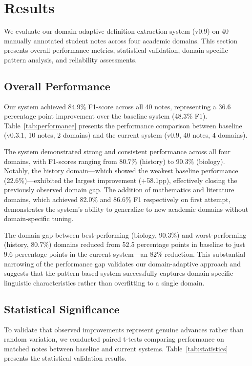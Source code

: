 \section{Results}

We evaluate our domain-adaptive definition extraction system (v0.9) on 40 manually annotated student notes across four academic domains. This section presents overall performance metrics, statistical validation, domain-specific pattern analysis, and reliability assessments.

\subsection{Overall Performance}

Our system achieved 84.9\% F1-score across all 40 notes, representing a 36.6 percentage point improvement over the baseline system (48.3\% F1). Table~\ref{tab:performance} presents the performance comparison between baseline (v0.3.1, 10 notes, 2 domains) and the current system (v0.9, 40 notes, 4 domains).



The system demonstrated strong and consistent performance across all four domains, with F1-scores ranging from 80.7\% (history) to 90.3\% (biology). Notably, the history domain—which showed the weakest baseline performance (22.6\%)—exhibited the largest improvement (+58.1pp), effectively closing the previously observed domain gap. The addition of mathematics and literature domains, which achieved 82.0\% and 86.6\% F1 respectively on first attempt, demonstrates the system's ability to generalize to new academic domains without domain-specific tuning.

The domain gap between best-performing (biology, 90.3\%) and worst-performing (history, 80.7\%) domains reduced from 52.5 percentage points in baseline to just 9.6 percentage points in the current system—an 82\% reduction. This substantial narrowing of the performance gap validates our domain-adaptive approach and suggests that the pattern-based system successfully captures domain-specific linguistic characteristics rather than overfitting to a single domain.

\subsection{Statistical Significance}

To validate that observed improvements represent genuine advances rather than random variation, we conducted paired t-tests comparing performance on matched notes between baseline and current systems. Table~\ref{tab:statistics} presents the statistical validation results.


